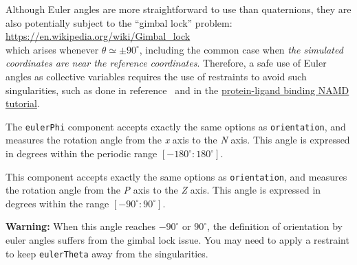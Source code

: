 Although Euler angles are more straightforward to use than quaternions, they are also potentially subject to the ``gimbal lock'' problem:\\
\url{https://en.wikipedia.org/wiki/Gimbal_lock}\\
\noindent{}which arises whenever $\theta \simeq \pm 90^\circ$, including the common case when \emph{the simulated coordinates are near the reference coordinates}.
Therefore, a safe use of Euler angles as collective variables requires the use of restraints to avoid such singularities, such as done in reference~\cite{Fu2017} and in the \href{http://www.ks.uiuc.edu/Training/Tutorials/namd/PLB/tutorial-protein-ligand.pdf}{protein-ligand binding NAMD tutorial}.

The \texttt{eulerPhi} component accepts exactly the same options as \texttt{orientation}, and 
measures the rotation angle from the \textit{x} axis to the \textit{N} axis. This 
angle is expressed in degrees within the periodic range 
$[-180^{\circ}:180^{\circ}]$.

\begin{cvcoptions}
\item %
\item %
\item %
\end{cvcoptions}



This component accepts exactly the same options as \texttt{orientation}, and 
measures the rotation angle from the \textit{P} axis to the \textit{Z} axis. 
This angle is expressed in degrees within the range $[-90^{\circ}:90^{\circ}]$.

\textbf{Warning:} When this angle reaches $-90^{\circ}$ or $90^{\circ}$, the 
definition of orientation by euler angles suffers from the gimbal lock issue. 
You may need to apply a restraint to keep \texttt{eulerTheta} away from the 
singularities.

